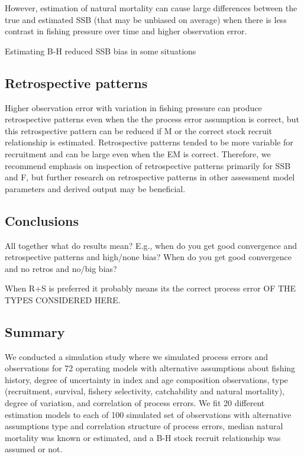 \documentclass[
  12pt,
]{article}
\begin{document}
However, estimation of natural mortality can cause large differences
between the true and estimated SSB (that may be unbiased on average)
when there is less contrast in fishing pressure over time and higher
observation error.

Estimating B-H reduced SSB bias in some situations

\hypertarget{retrospective-patterns}{%
\subsection*{Retrospective patterns}\label{retrospective-patterns}}

Higher observation error with variation in fishing pressure can produce
retrospective patterns even when the the process error assumption is
correct, but this retrospective pattern can be reduced if M or the
correct stock recruit relationship is estimated. Retrospective patterns
tended to be more variable for recruitment and can be large even when
the EM is correct. Therefore, we recommend emphasis on inspection of
retrospective patterns primarily for SSB and F, but further research on
retrospective patterns in other assessment model parameters and derived
output may be beneficial.

\hypertarget{conclusions}{%
\subsection*{Conclusions}\label{conclusions}}

All together what do results mean? E.g., when do you get good
convergence and retrospective patterns and high/none bias? When do you
get good convergence and no retros and no/big bias?

When R+S is preferred it probably means its the correct process error OF
THE TYPES CONSIDERED HERE.

\hypertarget{summary}{%
\subsection*{Summary}\label{summary}}

We conducted a simulation study where we simulated process errors and
observations for 72 operating models with alternative assumptions about
fishing history, degree of uncertainty in index and age composition
observations, type (recruitment, survival, fishery selectivity,
catchability and natural mortality), degree of variation, and
correlation of process errors. We fit 20 different estimation models to
each of 100 simulated set of observations with alternative assumptions
type and correlation structure of process errors, median natural
mortality was known or estimated, and a B-H stock recruit relationship
was assumed or not.
\end{document}
